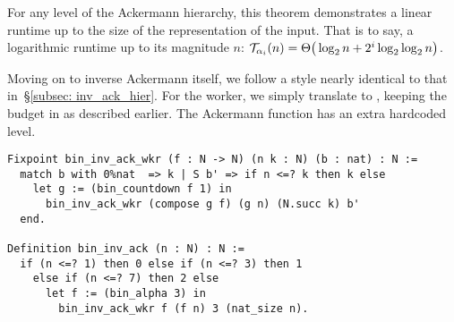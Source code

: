 \noindent For any level of the Ackermann hierarchy, this theorem demonstrates
a linear runtime up to the size of the representation of the input.
That is to say, a logarithmic runtime up to its magnitude $n$:
$\mathcal{T}_{\alpha_i}(n) = \Theta\big(\log_2n + 2^i\log_2\log_2n \big)$.

Moving on to inverse Ackermann itself, we follow a style nearly identical to that 
in~\S\ref{subsec: inv_ack_hier}. For the worker, we simply translate to 
, keeping the budget in  as described earlier. 
The Ackermann function has an extra hardcoded level.
\begin{lstlisting}
Fixpoint bin_inv_ack_wkr (f : N -> N) (n k : N) (b : nat) : N :=
  match b with 0%nat  => k | S b' => if n <=? k then k else
    let g := (bin_countdown f 1) in 
      bin_inv_ack_wkr (compose g f) (g n) (N.succ k) b'
  end.

Definition bin_inv_ack (n : N) : N :=
  if (n <=? 1) then 0 else if (n <=? 3) then 1
    else if (n <=? 7) then 2 else
      let f := (bin_alpha 3) in 
        bin_inv_ack_wkr f (f n) 3 (nat_size n).
\end{lstlisting}

